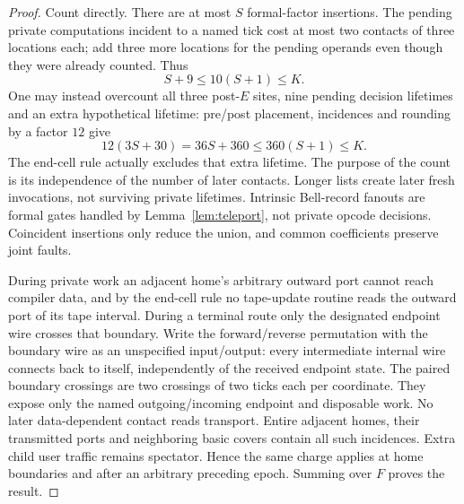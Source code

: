 \begin{proof}
Count directly. There are at most $S$ formal-factor insertions. The pending private computations incident to a named tick cost at most two contacts of three locations each; add three more locations for the pending operands even though they were already counted. Thus
\begin{equation}\label{eq:lifetime}
 S+9\le10(S+1)\le K.
\end{equation}
One may instead overcount all three post-$E$ sites, nine pending decision lifetimes and an extra hypothetical lifetime: pre/post placement, incidences and rounding by a factor $12$ give
\[
 12(3S+30)=36S+360\le360(S+1)\le K.
\]
The end-cell rule actually excludes that extra lifetime. The purpose of the count is its independence of the number of later contacts. Longer lists create later fresh invocations, not surviving private lifetimes. Intrinsic Bell-record fanouts are formal gates handled by Lemma~\ref{lem:teleport}, not private opcode decisions. Coincident insertions only reduce the union, and common coefficients preserve joint faults.

During private work an adjacent home's arbitrary outward port cannot reach compiler data, and by the end-cell rule no tape-update routine reads the outward port of its tape interval. During a terminal route only the designated endpoint wire crosses that boundary. Write the forward/reverse permutation with the boundary wire as an unspecified input/output: every intermediate internal wire connects back to itself, independently of the received endpoint state. The paired boundary crossings are two crossings of two ticks each per coordinate. They expose only the named outgoing/incoming endpoint and disposable work. No later data-dependent contact reads transport. Entire adjacent homes, their transmitted ports and neighboring basic covers contain all such incidences. Extra child user traffic remains spectator. Hence the same charge applies at home boundaries and after an arbitrary preceding epoch. Summing over $F$ proves the result.
\end{proof}

